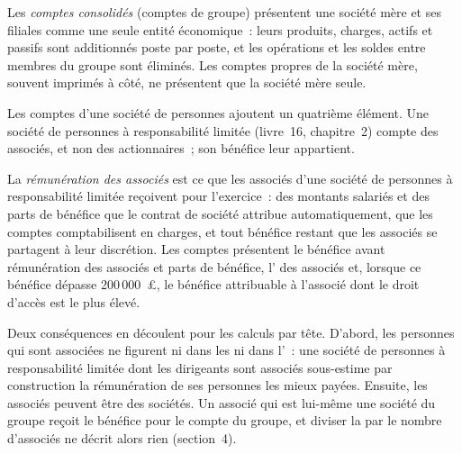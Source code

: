 \begin{definition}\label{def:in:reading-a-trading-firms-accounts:consolidated}
Les \emph{comptes consolidés} (comptes de groupe) présentent une société mère et ses filiales comme
une seule entité économique~: leurs produits, charges, actifs et passifs sont additionnés poste par poste, et les opérations et
les soldes entre membres du groupe sont éliminés. Les comptes propres de la société mère, souvent imprimés à côté, ne présentent que
la société mère seule.
\end{definition}

Les comptes d'une société de personnes ajoutent un quatrième élément. Une société de personnes à responsabilité limitée (livre~16, chapitre~2) compte des associés, et non
des actionnaires~; son bénéfice leur appartient.

\begin{definition}\label{def:in:reading-a-trading-firms-accounts:members}
La \emph{rémunération des associés} est ce que les associés d'une société de personnes à responsabilité limitée
reçoivent pour l'exercice~: des montants salariés et des parts de bénéfice que le contrat de société attribue automatiquement, que
les comptes comptabilisent en charges, et tout bénéfice restant que les associés se partagent à leur discrétion. Les comptes présentent
le bénéfice avant rémunération des associés et parts de bénéfice, l' des associés et, lorsque ce bénéfice dépasse
200\,000~\pounds, le bénéfice attribuable à l'associé dont le droit d'accès est le plus élevé.
\end{definition}

Deux conséquences en découlent pour les calculs par tête. D'abord, les personnes qui sont associées ne figurent ni dans les  ni dans l'~: une société de personnes à responsabilité limitée dont les dirigeants sont associés sous-estime par construction la rémunération de ses personnes les mieux payées.
Ensuite, les associés peuvent être des sociétés. Un associé qui est lui-même une société du groupe reçoit le bénéfice pour le compte du groupe, et
diviser la  par le nombre d'associés ne décrit alors rien (section~4).

